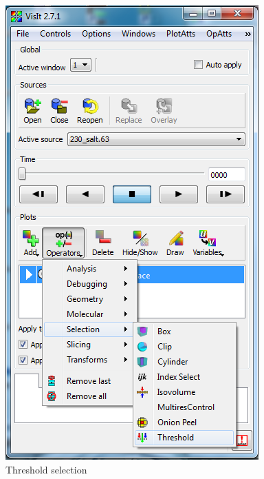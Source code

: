 \documentclass[12pt]{report}
\begin{document}
        \begin{figure}
        \begin{center}
        \includegraphics{thresholdSelection}
        \caption{Threshold selection }
        \label{figure:thresholdSelection}
        \end{center}
        \end{figure} 
        
\end{document}
